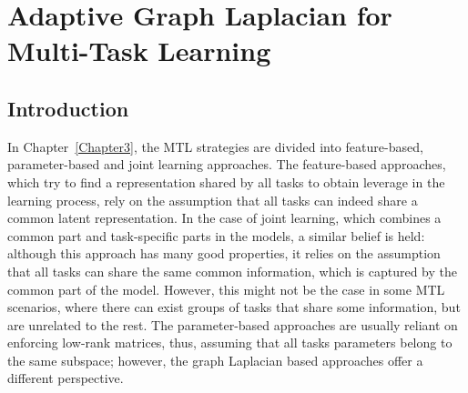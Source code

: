 
\chapter{Adaptive Graph Laplacian for Multi-Task Learning} %
\label{Chapter5}

{\bf \small{

}}

\section{Introduction}
In Chapter~\ref{Chapter3}, the MTL strategies are divided into feature-based, parameter-based and joint learning approaches.
The feature-based approaches, which try to find a representation shared by all tasks to obtain leverage in the learning process, rely on the assumption that all tasks can indeed share a common latent representation.
In the case of joint learning, which combines a common part and task-specific parts in the models, a similar belief is held: although this approach has many good properties, it relies on the assumption that all tasks can share the same common information, which is captured by the common part of the model.
However, this might not be the case in some MTL scenarios, where there can exist groups of tasks that share some information, but are unrelated to the rest.
The parameter-based approaches are usually reliant on enforcing low-rank matrices, thus, assuming that all tasks parameters belong to the same subspace; however, the graph Laplacian based approaches offer a different perspective.

